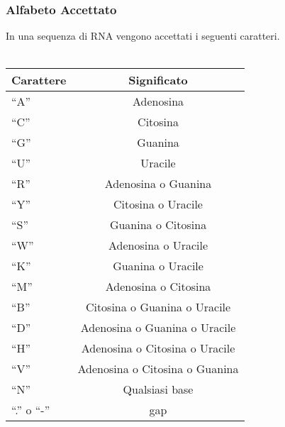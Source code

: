     \subsubsection{Alfabeto Accettato}
        In una sequenza di RNA vengono accettati i seguenti caratteri.\\ \\
        \begin{tabular}{|l|c|}
            \hline
            \textbf{Carattere} & \textbf{Significato}\\
            \hline
            ``A'' & Adenosina\\
            \hline
            ``C'' & Citosina\\
            \hline
            ``G'' & Guanina\\
            \hline
            ``U'' & Uracile\\
            \hline
            ``R'' & Adenosina o Guanina\\
            \hline
            ``Y'' & Citosina o Uracile\\
            \hline
            ``S'' & Guanina o Citosina\\
            \hline
            ``W'' & Adenosina o Uracile\\
            \hline
            ``K'' & Guanina o Uracile\\
            \hline
            ``M'' & Adenosina o Citosina\\
            \hline
            ``B'' & Citosina o Guanina o Uracile\\
            \hline
            ``D'' & Adenosina o Guanina o Uracile\\
            \hline
            ``H'' & Adenosina o Citosina o Uracile\\
            \hline
            ``V'' & Adenosina o Citosina o Guanina\\
            \hline
            ``N'' & Qualsiasi base\\
            \hline
            ``.'' o ``-'' & gap\\
            \hline
        \end{tabular}

